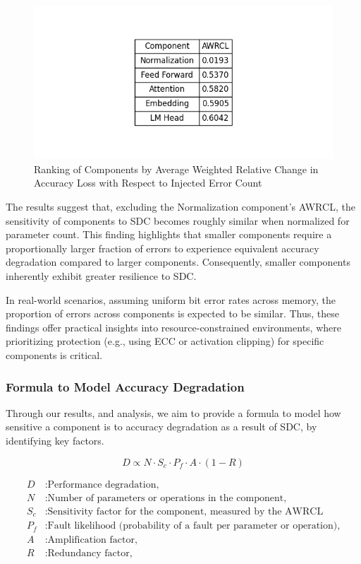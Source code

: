 \begin{figure}[!htbp]
    \centering
    \includegraphics[width=1\linewidth]{images/norm-comp-ranking.png}
    \caption{Ranking of Components by Average Weighted Relative Change in Accuracy Loss with Respect to Injected Error Count}
    \label{fig:enter-label}
\end{figure}

The results suggest that, excluding the Normalization component's AWRCL, the sensitivity of components to SDC becomes roughly similar when normalized for parameter count. This finding highlights that smaller components require a proportionally larger fraction of errors to experience equivalent accuracy degradation compared to larger components. Consequently, smaller components inherently exhibit greater resilience to SDC.

In real-world scenarios, assuming uniform bit error rates across memory, the proportion of errors across components is expected to be similar. Thus, these findings offer practical insights into resource-constrained environments, where prioritizing protection (e.g., using ECC or activation clipping) for specific components is critical.

\subsubsection{Formula to Model Accuracy Degradation}

Through our results, and analysis, we aim to provide a formula to model how sensitive a component is to accuracy degradation as a result of SDC, by identifying key factors.


\[
D \propto N \cdot S_c\cdot P_f \cdot A \cdot (1 - R)
\]

\begin{align*}
D & : \text{Performance degradation,} \\
N & : \text{Number of parameters or operations in the component,} \\
S_c & : \text{Sensitivity factor for the component, measured by the AWRCL} \\
P_f & : \text{Fault likelihood (probability of a fault per parameter or operation),} \\
A & : \text{Amplification factor,} \\
R & : \text{Redundancy factor,} \\
\end{align*}

